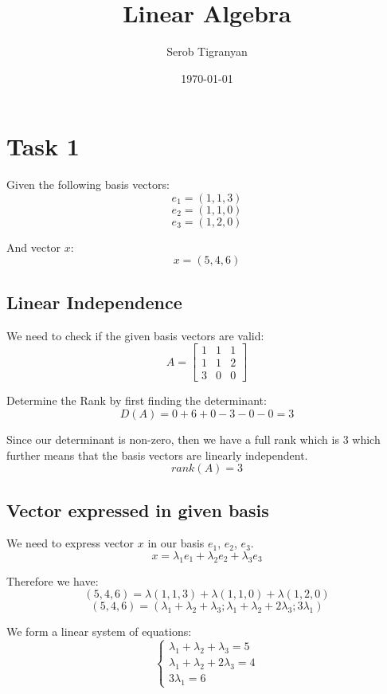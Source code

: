 \documentclass[11pt]{article}
\author{Serob Tigranyan}
\date{\today}
\title{Linear Algebra}
\begin{document}
\maketitle
\tableofcontents

\newpage
\section{Task 1}
\label{sec:org1641612}
Given the following basis vectors:
\[
e_1=(1,1,3)
\]
\[
e_2=(1,1,0)
\]
\[
e_3=(1,2,0)
\]

And vector \(x\):
\[
x=(5,4,6)
\]
\subsection{Linear Independence}
\label{sec:org3e4815c}
We need to check if the given basis vectors are valid:
\[
A =
\begin{bmatrix}
1 & 1 & 1 \\
1 & 1 & 2 \\
3 & 0 & 0
\end{bmatrix}
\]

Determine the Rank by first finding the determinant:
\[
D(A) = 0 + 6 + 0 -3 - 0 -0 = 3
\]

Since our determinant is non-zero, then we have a full rank which is 3 which further means that the basis vectors are linearly independent. 
\[
rank(A) = 3
\]
\subsection{Vector expressed in given basis}
\label{sec:orgef50213}
We need to express vector \(x\) in our basis \(e_1\), \(e_2\), \(e_3\).
\[
x=\lambda_1 e_1 + \lambda_2 e_2 + \lambda_3 e_3
\]

Therefore we have:
\[
(5,4,6)=\lambda (1,1,3) + \lambda (1,1,0) + \lambda (1,2,0)
\]
\[
(5,4,6)=(\lambda_1 + \lambda_2 + \lambda_3; \lambda_1 + \lambda_2 + 2 \lambda_3; 3 \lambda_1)
\]

We form a linear system of equations:
\[
\left\{
\begin{aligned}
\lambda_1 + \lambda_2 + \lambda_3 = 5 \\
\lambda_1 + \lambda_2 + 2 \lambda_3 = 4 \\
3 \lambda_1 = 6
\end{aligned}
\]
\end{document}
